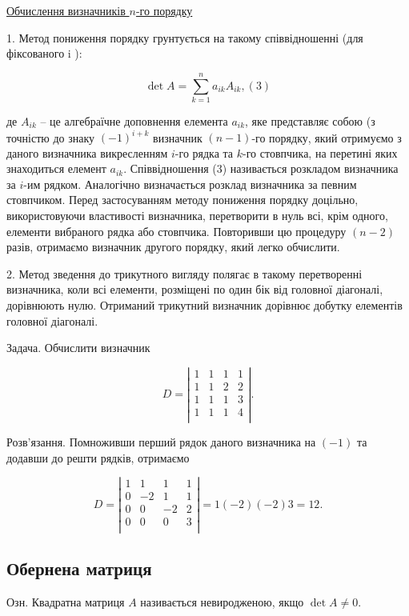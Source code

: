 \underline{Обчислення визначників $n$-го порядку}

1. Метод пониження порядку грунтується на такому співвідношенні (для фіксованого i ):

$$\det A = \sum\limits_{k=1}^n a_{ik} A_{ik}, (3)$$


де $A_{ik}$ -- це алгебраїчне доповнення елемента $a_{ik}$, яке представляє собою (з точністю
до знаку $(-1)^{i+k}$ визначник $(n-1)$-го порядку, який отримуємо з даного 
визначника викресленням $i$-го рядка та $k$-го стовпчика, на перетині яких
знаходиться елемент $a_{ik}$. Співвідношення (3) називається розкладом визначника
за $i$-им рядком. Аналогічно визначається розклад визначника за певним
стовпчиком. Перед застосуванням методу пониження порядку доцільно,
використовуючи властивості визначника, перетворити в нуль всі, крім одного,
елементи вибраного рядка або стовпчика. Повторивши цю процедуру $(n-2)$ разів,
отримаємо визначник другого порядку, який легко обчислити.

2. Метод зведення до трикутного вигляду полягає в такому перетворенні
визначника, коли всі елементи, розміщені по один бік від головної діагоналі,
дорівнюють нулю. Отриманий трикутний визначник дорівнює добутку елементів
головної діагоналі.


Задача. Обчислити визначник

$$D = \left|\begin{matrix}
	1 & 1 & 1 & 1 \\
	1 & 1 & 2 & 2 \\
	1 & 1 & 1 & 3 \\
	1 & 1 & 1 & 4 \\
\end{matrix} \right|.$$


Розв’язання. Помноживши перший рядок даного визначника на $(-1)$ та
додавши до решти рядків, отримаємо

$$D = \left|\begin{matrix}
	1 & 1  & 1  & 1 \\
	0 & -2 & 1  & 1 \\
	0 & 0  & -2 & 2 \\
	0 & 0  & 0  & 3 \\
\end{matrix} \right| = 1(-2)(-2)3 = 12.$$

\subsection{Обернена матриця}

Озн. Квадратна матриця $A$ називається невиродженою, якщо $\det A \neq 0$.

